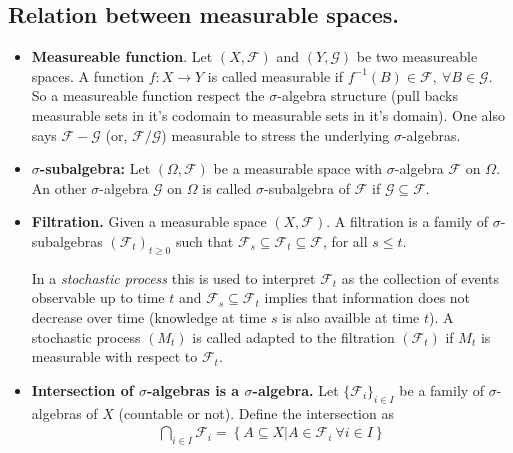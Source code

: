 \documentclass[10pt,a4paper]{article}
\begin{document}
\subsection{Relation between measurable spaces.}

\begin{itemize}
\item 
\textbf{Measureable function}. Let $(X, \mathcal F)$ and $(Y, \mathcal G)$ be two measureable spaces. A function  $f: X \rightarrow Y$ is called  measurable  if $   f^{-1}(B) \in \mathcal F, ~\forall B \in \mathcal G$. So a measureable function respect the $\sigma$-algebra structure (pull backs measurable sets in it's codomain to measurable sets in it's domain). One also says $\mathcal F-\mathcal G$ (or, $\mathcal F / \mathcal G$) measurable to stress the underlying $\sigma$-algebras.
\item 
\textbf{$\sigma$-subalgebra:} Let $(\Omega, \mathcal F)$ be a measurable space with $\sigma$-algebra $\mathcal F$ on $\Omega$. An other $\sigma$-algebra $\mathcal G$ on $\Omega$ is called $\sigma$-subalgebra of $\mathcal F$ if $\mathcal G \subseteq \mathcal F $. 

\item 
\textbf{Filtration.} Given a measurable space $(X, \mathcal F)$. A filtration is a family of $\sigma$-subalgebras $\left(\mathcal F_t\right)_{t\geq0}$ such that $\mathcal F_s\subseteq \mathcal F_t \subseteq \mathcal F$, for all $s \leq t$. 

In a \textit{stochastic process} this is used to interpret  $\mathcal F_t$ as the collection of events observable up to time $t$ and $\mathcal F_s\subseteq \mathcal F_t$ implies that information does not decrease over time (knowledge at time $s$ is also availble at time $t$). A stochastic process $\left(M_t\right)$ is called adapted to the filtration $\left(\mathcal F_t\right)$ if $M_t$ is measurable with respect to $\mathcal F_t$.

\item 
\textbf{Intersection of $\sigma$-algebras is a $\sigma$-algebra. }Let $\{ \mathcal F_i \}_{i \in I}$ be a family of  $\sigma$-algebras  of $X$ (countable or not).  Define the intersection as 
\begin{align*}	
	\bigcap\limits_{i \in I} \mathcal F_i = \left \{    A \subseteq X   |  A \in \mathcal F_i  ~\forall i \in I \right  \}
\end{align*}


\end{itemize}
\end{document}
